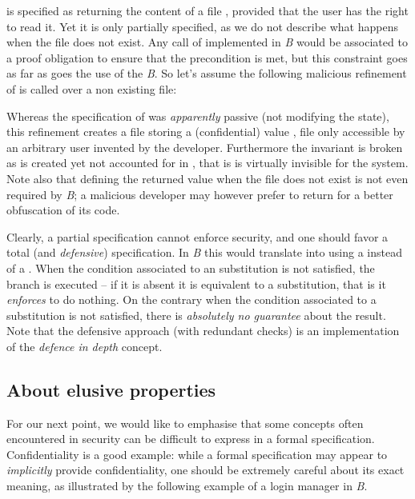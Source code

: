 \documentclass[conference]{IEEEtran}
\begin{document}
{\small} is specified as returning the content of a file {\small}, provided
that the user {\small} has the right to read it. Yet it is only partially specified, as we
do not describe what happens when the file does not exist. Any call of {\small}
implemented in \emph{B} would be associated to a proof obligation to ensure that the
precondition is met, but this constraint goes as far as goes the use of the \emph{B}. So let's
assume the following malicious refinement of {\small} is called over a non
existing file:

Whereas the specification of {\small} was \emph{apparently} passive (not modifying
the state), this refinement creates a file {\small} storing a (confidential) value
{\small}, file only accessible by an arbitrary user {\small} invented by the
developer. Furthermore the invariant is broken as {\small} is created yet not accounted
for in {\small}, that is {\small} is virtually invisible for the system. Note also
that defining the returned value when the file does not exist is not even required by
\emph{B}; a malicious developer may however prefer to return {\small} for a
better obfuscation of its code.

Clearly, a partial specification cannot enforce security, and one should favor a total (and
\emph{defensive}) specification. In \emph{B} this would translate into using a
{\small} instead of a {\small}. When the condition associated to an
{\small} substitution is not satisfied, the {\small} branch is executed
-- if it is absent it is equivalent to a {\small} substitution, that is it
\emph{enforces} to do nothing. On the contrary when the condition associated to a
{\small} substitution is not satisfied, there is \emph{absolutely no guarantee}
about the result. Note that the defensive approach (with redundant checks) is an
implementation of the \emph{defence in depth} concept.

\subsection{About elusive properties}\label{elusive_prop}

For our next point, we would like to emphasise that some concepts often encountered in
security can be difficult to express in a formal specification. Confidentiality is a good
example: while a formal specification may appear to \emph{implicitly} provide confidentiality,
one should be extremely careful about its exact meaning, as illustrated by the following
example of a login manager in \emph{B}.
\end{document}
